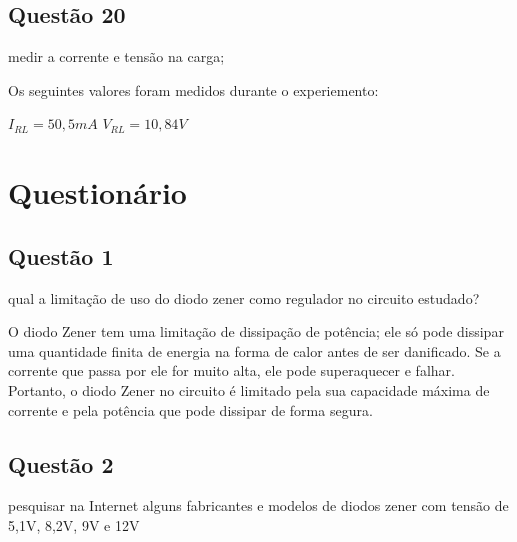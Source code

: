 \documentclass{article}
\begin{document}
\subsection{Questão 20}

\begin{tcolorbox}[title=\large Questão 20, colback=red!5!white, colframe=red!75!black]
    \large
    medir a corrente e tensão na carga;
\end{tcolorbox}

Os seguintes valores foram medidos durante o experiemento:

\begin{center}
    \begin{tcolorbox}[width=0.6\textwidth]
        \centering
        $I_{RL} = 50,5mA$
        \hspace{2cm}
        $V_{RL} = 10,84V$
    \end{tcolorbox}
\end{center}

\section{Questionário}

\subsection{Questão 1}

\begin{tcolorbox}[title=\large Questão 1, colback=red!5!white, colframe=red!75!black]
    \large
    qual a limitação de uso do diodo zener como regulador no circuito estudado?
\end{tcolorbox}

O diodo Zener tem uma limitação de dissipação de potência; ele só pode dissipar uma quantidade finita de energia na forma de calor antes de ser danificado. Se a corrente que passa por ele for muito alta, ele pode superaquecer e falhar. Portanto, o diodo Zener no circuito é limitado pela sua capacidade máxima de corrente e pela potência que pode dissipar de forma segura.

\subsection{Questão 2}

\begin{tcolorbox}[title=\large Questão 2, colback=red!5!white, colframe=red!75!black]
    \large
    pesquisar na Internet alguns fabricantes e modelos de diodos zener com tensão de 5,1V, 8,2V, 9V e 12V
\end{tcolorbox}
\end{document}

